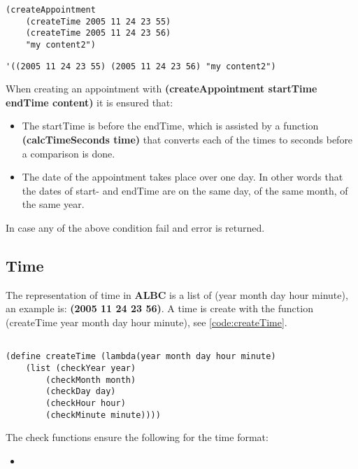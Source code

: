 \documentclass{IOS-Book-Article}
\begin{document}
\begin{lstlisting}[frame=single, caption={Creating an appointment}, label={code:appointmentCreation}] 
(createAppointment 
	(createTime 2005 11 24 23 55)
	(createTime 2005 11 24 23 56) 
	"my content2")
\end{lstlisting}

\begin{lstlisting}[frame=single, caption={Appointment representation}, label={code:appointmentRepresentation}] 
'((2005 11 24 23 55) (2005 11 24 23 56) "my content2")
\end{lstlisting}

When creating an appointment with \textbf{(createAppointment startTime endTime content)} it is ensured that:
\begin{itemize}
\item The startTime is before the endTime, which is assisted by a function \textbf{(calcTimeSeconds time)} that converts each of the times to seconds before a comparison is done.
\item The date of the appointment takes place over one day. In other words that the dates of start- and endTime are on the same day, of the same month, of the same year.
\end{itemize}
In case any of the above condition fail and error is returned.


\subsection{Time}
The representation of time in \textbf{ALBC} is a list of (year month day hour minute), an example is: \textbf{(2005 11 24 23 56)}. A time is create with the function (createTime year month day hour minute), see \autoref{code:createTime}.

\begin{lstlisting}[frame=single, caption={Definition of (createTime year month day hour minute)}, label={code:createTime}]  % Start your code-block

(define createTime (lambda(year month day hour minute)
 	(list (checkYear year) 
 		(checkMonth month) 
 		(checkDay day) 
	 	(checkHour hour) 
	 	(checkMinute minute))))  
\end{lstlisting}

The check functions ensure the following for the time format:
\begin{itemize}
\item
\end{itemize}
\end{document}
